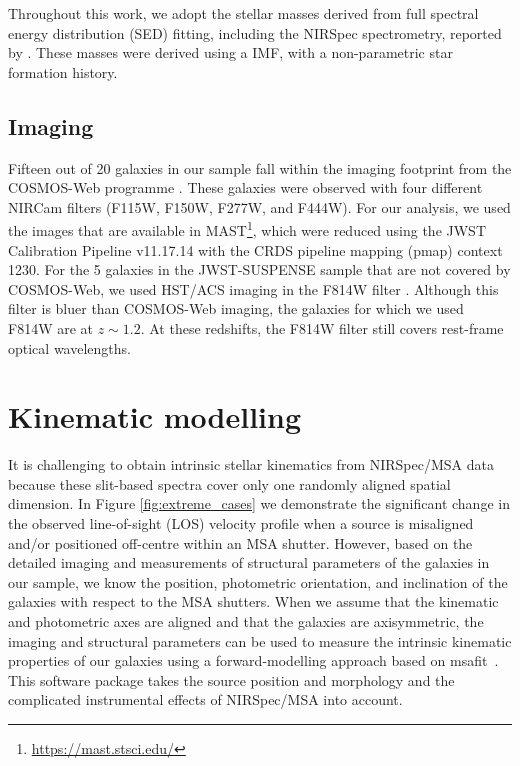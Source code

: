 \documentclass{aa}
\newcommand{\msafit}{{\sc msafit}}
\begin{document}
Throughout this work, we adopt the stellar masses derived from full spectral energy distribution (SED) fitting, including the NIRSpec spectrometry, reported by \citet{MSlob2024}. These masses were derived using a \citet{GChabrier2003} IMF, with a non-parametric star formation history.

\subsection{Imaging}
Fifteen out of 20 galaxies in our sample fall within the imaging footprint from the COSMOS-Web programme \citep[Programme ID: 1727][]{CCasey2023}. These galaxies were observed with four different NIRCam filters (F115W, F150W, F277W, and F444W). For our analysis, we used the images that are available in MAST\footnote{\url{https://mast.stsci.edu/}}, which were reduced using the JWST Calibration Pipeline v11.17.14 with the CRDS pipeline mapping (pmap) context 1230. For the 5 galaxies in the JWST-SUSPENSE sample that are not covered by COSMOS-Web, we used HST/ACS imaging in the F814W filter \citep{NScoville2007}. Although this filter is bluer than COSMOS-Web imaging, the galaxies for which we used F814W are at $z\sim1.2$. At these redshifts, the F814W filter still covers rest-frame optical wavelengths.

\section{Kinematic modelling}\label{sec:modelling}
It is challenging to obtain intrinsic stellar kinematics from NIRSpec/MSA data because these slit-based spectra cover only one randomly aligned spatial dimension. In Figure \ref{fig:extreme_cases} we demonstrate the significant change in the observed line-of-sight (LOS) velocity profile when a source is misaligned and/or positioned off-centre within an MSA shutter. However, based on the detailed imaging and measurements of structural parameters of the galaxies in our sample, we know the position, photometric orientation, and inclination of the galaxies with respect to the MSA shutters. When we assume that the kinematic and photometric axes are aligned and that the galaxies are axisymmetric, the imaging and structural parameters can be used to measure the intrinsic kinematic properties of our galaxies using a forward-modelling approach based on \msafit\ \citep{AdeGraaff2024_kinematics}. This software package takes the source position and morphology and the complicated instrumental effects of NIRSpec/MSA into account.
\end{document}

